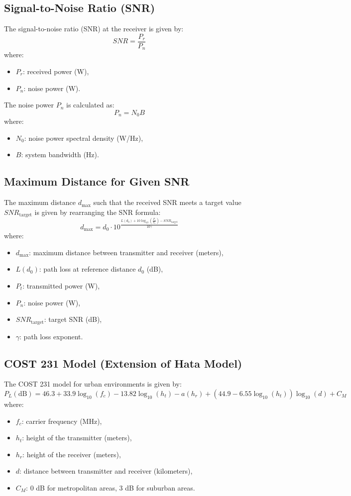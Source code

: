 \documentclass[a4paper,12pt]{book}
\begin{document}
	\subsection{Signal-to-Noise Ratio (SNR)}
	The signal-to-noise ratio (SNR) at the receiver is given by:
	\[
	SNR = \frac{P_r}{P_n}
	\]
	where:
	\begin{itemize}
		\item \( P_r \): received power (W),
		\item \( P_n \): noise power (W).
	\end{itemize}
	
	The noise power \( P_n \) is calculated as:
	\[
	P_n = N_0 B
	\]
	where:
	\begin{itemize}
		\item \( N_0 \): noise power spectral density (W/Hz),
		\item \( B \): system bandwidth (Hz).
	\end{itemize}
	
	\subsection{Maximum Distance for Given SNR}
	The maximum distance \(d_{\text{max}}\) such that the received SNR meets a target value \(SNR_{\text{target}}\) is given by rearranging the SNR formula:
	\[
	d_{\text{max}} = d_0 \cdot 10^{\frac{L(d_0) + 10 \log_{10} \left( \frac{P_t}{P_n} \right) - SNR_{\text{target}}}{10 \gamma}}
	\]
	where:
	\begin{itemize}
		\item \( d_{\text{max}} \): maximum distance between transmitter and receiver (meters),
		\item \( L(d_0) \): path loss at reference distance \(d_0\) (dB),
		\item \( P_t \): transmitted power (W),
		\item \( P_n \): noise power (W),
		\item \( SNR_{\text{target}} \): target SNR (dB),
		\item \( \gamma \): path loss exponent.
	\end{itemize}
	
	\subsection{COST 231 Model (Extension of Hata Model)}
	The COST 231 model for urban environments is given by:
	\[
	P_L(\text{dB}) = 46.3 + 33.9 \log_{10}(f_c) - 13.82 \log_{10}(h_t) - a(h_r) + \left( 44.9 - 6.55 \log_{10}(h_t) \right) \log_{10}(d) + C_M
	\]
	where:
	\begin{itemize}
		\item \( f_c \): carrier frequency (MHz),
		\item \( h_t \): height of the transmitter (meters),
		\item \( h_r \): height of the receiver (meters),
		\item \( d \): distance between transmitter and receiver (kilometers),
		\item \( C_M \): 0 dB for metropolitan areas, 3 dB for suburban areas.
	\end{itemize}
	
\end{document}
